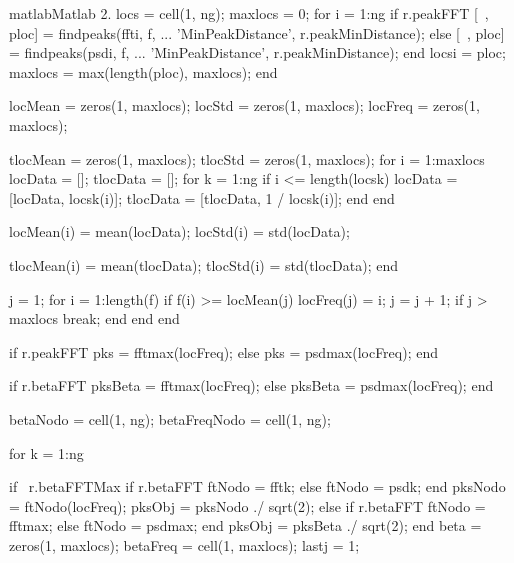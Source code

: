 \begin{sourcecode}{matlab}{Matlab 2.}
locs = cell(1, ng);
maxlocs = 0;
for i = 1:ng
    if r.peakFFT
        [~, ploc] = findpeaks(fft{i}, f, ...
            'MinPeakDistance', r.peakMinDistance);
    else
        [~, ploc] = findpeaks(psd{i}, f, ...
            'MinPeakDistance', r.peakMinDistance);
    end
    locs{i} = ploc;
    maxlocs = max(length(ploc), maxlocs);
end %

locMean = zeros(1, maxlocs);
locStd = zeros(1, maxlocs);
locFreq = zeros(1, maxlocs); %

tlocMean = zeros(1, maxlocs);
tlocStd = zeros(1, maxlocs);
for i = 1:maxlocs
    locData = []; %
    tlocData = [];
    for k = 1:ng %
        if i <= length(locs{k})
            locData = [locData, locs{k}(i)]; %
            tlocData = [tlocData, 1 / locs{k}(i)]; %
        end
    end %
    
    locMean(i) = mean(locData);
    locStd(i) = std(locData);
    
    tlocMean(i) = mean(tlocData);
    tlocStd(i) = std(tlocData);
end %

j = 1; %
for i = 1:length(f)
    if f(i) >= locMean(j)
        locFreq(j) = i;
        j = j + 1; %
        if j > maxlocs
            break;
        end
    end
end %

if r.peakFFT
    pks = fftmax(locFreq);
else
    pks = psdmax(locFreq);
end

if r.betaFFT
    pksBeta = fftmax(locFreq);
else
    pksBeta = psdmax(locFreq);
end

betaNodo = cell(1, ng);
betaFreqNodo = cell(1, ng);

for k = 1:ng
    
    if ~r.betaFFTMax %
        if r.betaFFT
            ftNodo = fft{k};
        else
            ftNodo = psd{k};
        end
        pksNodo = ftNodo(locFreq);
        pksObj = pksNodo ./ sqrt(2);
    else %
        if r.betaFFT
            ftNodo = fftmax;
        else
            ftNodo = psdmax;
        end
        pksObj = pksBeta ./ sqrt(2);
    end
    beta = zeros(1, maxlocs);
    betaFreq = cell(1, maxlocs);
    lastj = 1;
    

\end{sourcecode}
